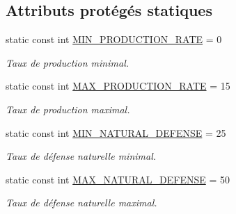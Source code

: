 \subsection*{Attributs protégés statiques}
\begin{DoxyCompactItemize}
\item 
\hypertarget{classVirtual__planet_a5c08ee009e9d9d0b284b133e18c2b7f9}{static const int \hyperlink{classVirtual__planet_a5c08ee009e9d9d0b284b133e18c2b7f9}{M\-I\-N\-\_\-\-P\-R\-O\-D\-U\-C\-T\-I\-O\-N\-\_\-\-R\-A\-T\-E} = 0}\label{classVirtual__planet_a5c08ee009e9d9d0b284b133e18c2b7f9}

\begin{DoxyCompactList}\small\item\em Taux de production minimal. \end{DoxyCompactList}\item 
\hypertarget{classVirtual__planet_a0899115c7ae16c4e07e6319209b678cc}{static const int \hyperlink{classVirtual__planet_a0899115c7ae16c4e07e6319209b678cc}{M\-A\-X\-\_\-\-P\-R\-O\-D\-U\-C\-T\-I\-O\-N\-\_\-\-R\-A\-T\-E} = 15}\label{classVirtual__planet_a0899115c7ae16c4e07e6319209b678cc}

\begin{DoxyCompactList}\small\item\em Taux de production maximal. \end{DoxyCompactList}\item 
\hypertarget{classVirtual__planet_ae0e71188803de0af557c7a1db8bd2d95}{static const int \hyperlink{classVirtual__planet_ae0e71188803de0af557c7a1db8bd2d95}{M\-I\-N\-\_\-\-N\-A\-T\-U\-R\-A\-L\-\_\-\-D\-E\-F\-E\-N\-S\-E} = 25}\label{classVirtual__planet_ae0e71188803de0af557c7a1db8bd2d95}

\begin{DoxyCompactList}\small\item\em Taux de défense naturelle minimal. \end{DoxyCompactList}\item 
\hypertarget{classVirtual__planet_ad5b8a23606fded6c444a93136fceab0a}{static const int \hyperlink{classVirtual__planet_ad5b8a23606fded6c444a93136fceab0a}{M\-A\-X\-\_\-\-N\-A\-T\-U\-R\-A\-L\-\_\-\-D\-E\-F\-E\-N\-S\-E} = 50}\label{classVirtual__planet_ad5b8a23606fded6c444a93136fceab0a}

\begin{DoxyCompactList}\small\item\em Taux de défense naturelle maximal. \end{DoxyCompactList}\end{DoxyCompactItemize}


